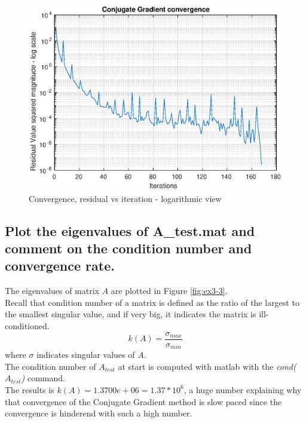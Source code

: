 \documentclass[unicode,11pt,a4paper,oneside,numbers=endperiod,openany]{scrartcl}
\begin{document}
\begin{figure}[H]
    \centering
    \caption{Convergence, residual vs iteration - logarithmic view}
    \label{fig:ex3-2}
    \includegraphics[width=\textwidth, trim={0cm 0cm 0cm 0cm}]{./figures/ex3-2.eps}
\end{figure}

\subsection{Plot the eigenvalues of A\_test.mat
    and comment on the condition number and convergence rate.}

The eigenvalues of matrix $A$ are plotted in Figure \ref{fig:ex3-3}.\\
Recall that condition number of a matrix is defined as the ratio of the largest
to the smallest singular value, and if very big, it indicates the matrix is ill-conditioned. \\
\[k(A) = \frac{\sigma_{max}}{\sigma_{min}}\]
where $\sigma$ indicates singular values of $A$.\\
The condition number of $A_{test}$ at start is computed with matlab
with the \textit{cond($A_{test}$)} command.\\
The results is $k(A) = 1.3700e+06 = 1.37 * 10^6$, a huge number explaining why that convergence
of the Conjugate Gradient method is slow paced since the convergence is hinderend with such a high number.
\end{document}
